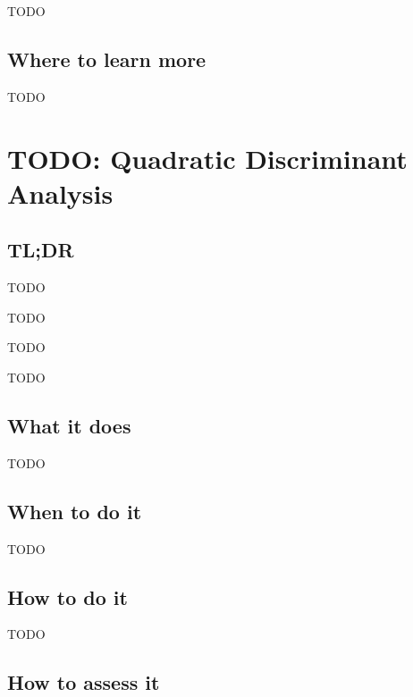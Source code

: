 \documentclass[
]{book}
\providecommand{\tightlist}{%
  \setlength{\itemsep}{0pt}\setlength{\parskip}{0pt}}
\begin{document}
TODO

\hypertarget{where-to-learn-more-4}{%
\section{Where to learn more}\label{where-to-learn-more-4}}

TODO

\hypertarget{quadratic-discriminant-analysis}{%
\chapter{TODO: Quadratic Discriminant Analysis}\label{quadratic-discriminant-analysis}}

\hypertarget{tldr-5}{%
\section{TL;DR}\label{tldr-5}}

\begin{description}
\tightlist
\item[What it does]
TODO
\item[When to do it]
TODO
\item[How to do it]
TODO
\item[How to assess it]
TODO
\end{description}

\hypertarget{what-it-does-5}{%
\section{What it does}\label{what-it-does-5}}

TODO

\hypertarget{when-to-do-it-5}{%
\section{When to do it}\label{when-to-do-it-5}}

TODO

\hypertarget{how-to-do-it-5}{%
\section{How to do it}\label{how-to-do-it-5}}

TODO

\hypertarget{how-to-assess-it-5}{%
\section{How to assess it}\label{how-to-assess-it-5}}
\end{document}
